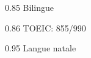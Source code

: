
    {0.85}
    {Bilingue}
    {}{}{}

    {0.86}
    {TOEIC: 855/990}
    {}{}{}

    {0.95}
    {Langue natale}
    {}{}{}

%
